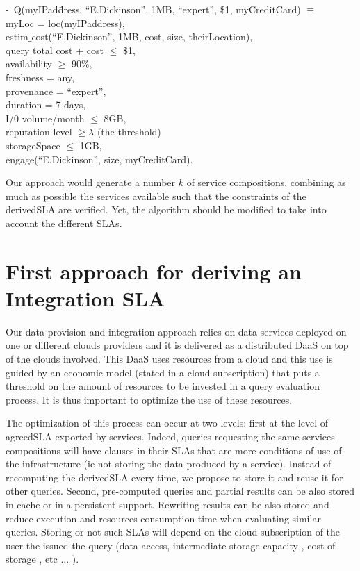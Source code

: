 \begin{footnotesize}
\sf
\begin{tabbing}
 -~Q(myIPad\=dress, ``E.Dickinson'', 1MB, ``expert'', \$1, myCreditCard) $\equiv$ \\
 \>  myLoc = loc(myIPaddress), \\
 \>  estim$\_$cost(``E.Dickinson'', 1MB, cost, size, theirLocation), \\
 \>  query total cost + cost $\leq$ \$1,\\
 \>  availability $\geq$ 90$\%$, \\
 \>  freshness = any, \\
 \>  provenance = ``expert'', \\
 \>  duration = 7 days, \\
 \>  I/0 volume/month $\leq$ 8GB, \\
 \>  reputation level $\geq \lambda$ (the threshold) \\
 \>  storageSpace $\leq$ 1GB, \\
 \>  engage(``E.Dickinson'', size, myCreditCard).
 \end{tabbing} 
\end{footnotesize}

Our approach would generate a number $k$ of service compositions, combining as much as possible the services available such that the constraints of the derivedSLA are verified. 
 Yet, the algorithm should be modified to take into account the different SLAs. 
 
\section{First approach for deriving an Integration SLA}
\label{sec:queryProcessOpt}
 Our data provision and integration approach relies on data services deployed on one or different clouds providers and it is delivered as a distributed DaaS on top of the clouds involved.  This DaaS  uses resources from a cloud and this use  is  guided by an economic model (stated in a cloud subscription) that puts a threshold on the amount of resources to be invested in a query evaluation process. It is thus important to optimize the use of these resources. 
   
The optimization of this process can occur at two levels: first at the level of agreedSLA exported by services.  Indeed, queries requesting the same services compositions will have clauses in their SLAs that are more conditions of use of the infrastructure (ie not storing the data produced by a service). Instead of recomputing the derivedSLA every time, we propose to store it and reuse it for other queries. 
Second, pre-computed queries and partial results can be also stored in cache or in a persistent support. Rewriting results can be also stored and reduce execution and resources consumption time when evaluating similar queries. Storing or not such SLAs will depend on the cloud subscription of the user the issued the query (data access, intermediate storage capacity , cost of storage , etc ... ).


